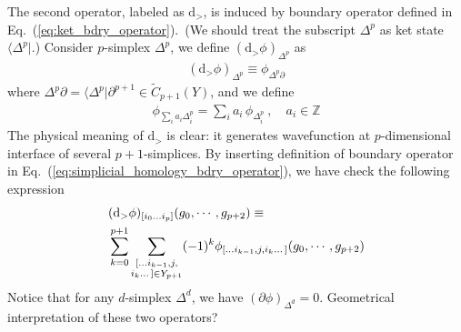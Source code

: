 \documentclass[%
  reprint,
  amsmath,amssymb,
  aps,pra,
]{revtex4-1}
\newcommand{\dd}{\mathrm{d}} %
\newcommand{\ZZ}{\mathbb{Z}} %
\begin{document}
The second operator, labeled as $\dd_>$, is induced by boundary operator defined in Eq.~(\ref{eq:ket_bdry_operator}).~(We should treat the subscript $\Delta^p$ as ket state $\langle\Delta^p|$.)
Consider $p$-simplex $\Delta^p$, we define $(\dd_>\phi)_{\Delta^p}$ as
\begin{align}
  (\dd_>\phi)_{\Delta^p}\equiv \phi_{\Delta^p\partial}
\end{align}
where $\Delta^p\partial=\langle\Delta^p|\partial^{p+1}\in \widetilde{C}_{p+1}(Y)$, and we define
\begin{align}
  \phi_{\sum_i a_i\Delta^p_i}=\sum_i a_i\,\phi_{\Delta^p_i}~,\quad a_i\in\ZZ
  \label{}
\end{align}
The physical meaning of $\dd_>$ is clear:
it generates wavefunction at $p$-dimensional interface of several $p+1$-simplices.
By inserting definition of boundary operator in Eq.~(\ref{eq:simplicial_homology_bdry_operator}), we have
{\color{red} check the following expression}
\begin{align}
  &(\dd_>\phi)_{[i_0\dots i_{p}]}(g_0,\cdots,g_{p+2})\equiv\notag\\
  &\sum_{k=0}^{p+1}\sum_{\substack{[\dots i_{k-1},j,\\i_{k}\dots]\in Y_{p+1}}}(-1)^k\phi_{[\dots i_{k-1},j,i_{k}\dots]}(g_0,\cdots,g_{p+2})
\end{align}
Notice that for any $d$-simplex $\Delta^d$, we have $(\partial\phi)_{\Delta^d}=0$.
{\color{red} Geometrical interpretation of these two operators?}
\end{document}
